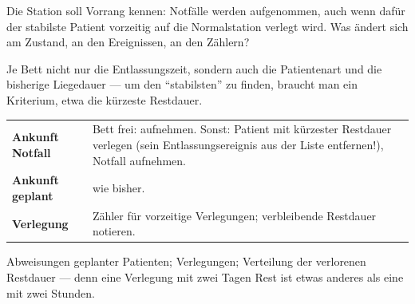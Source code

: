 \begin{aufgabe}
Die Station soll Vorrang kennen: Notfälle werden aufgenommen, auch wenn dafür der stabilste Patient vorzeitig auf die Normalstation verlegt wird. Was ändert sich am Zustand, an den Ereignissen, an den Zählern?

\loesung
{}
Je Bett nicht nur die Entlassungszeit, sondern auch die Patientenart und die bisherige Liegedauer --- um den \enquote{stabilsten} zu finden, braucht man ein Kriterium, etwa die kürzeste Restdauer.

\begin{center}
{\small
\renewcommand{\arraystretch}{1.5}
\begin{tabular}{@{}P{2.8cm}P{5.8cm}@{}}
\toprule
\textbf{Ankunft Notfall} & Bett frei: aufnehmen. Sonst: Patient mit kürzester Restdauer verlegen (sein Entlassungsereignis aus der Liste entfernen!), Notfall aufnehmen.\\
\textbf{Ankunft geplant} & wie bisher.\\
\textbf{Verlegung} & Zähler für vorzeitige Verlegungen; verbleibende Restdauer notieren.\\
\bottomrule
\end{tabular}}
\end{center}

Abweisungen geplanter Patienten; Verlegungen; Verteilung der verlorenen Restdauer --- denn eine Verlegung mit zwei Tagen Rest ist etwas anderes als eine mit zwei Stunden.

\begin{center}
\begin{minipage}{0.88\textwidth}
\end{minipage}
\end{center}
\end{aufgabe}

